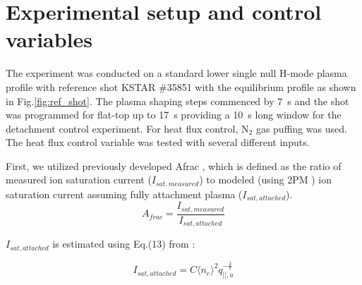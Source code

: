 

\section{Experimental setup and control variables}
\label{sec:control_variables}



The experiment was conducted on a standard lower single null H-mode plasma profile with reference shot KSTAR \#35851 with the equilibrium profile as shown in Fig.\ref{fig:ref_shot}.
The plasma shaping steps commenced by 7~s and the shot was programmed for flat-top up to 17~s providing a 10~s long window for the detachment control experiment.
For heat flux control, N$_2$ gas puffing was used.
The heat flux control variable was tested with several different inputs.

First, we utilized previously developed \ac{Afrac} \cite{Eldon_2022_PPCF}, which is defined as the ratio of measured ion saturation current ($I_{sat, measured}$) to modeled (using 2PM \cite{Leonard_2018_PPCF}) ion saturation current assuming fully attachment plasma ($I_{sat, attached}$).
\begin{equation}
    A_{frac} = \frac{I_{sat, measured}}{I_{sat, attached}}
\end{equation}

$I_{sat, attached}$ is estimated using Eq.(13) from \cite{Eldon_2022_PPCF}:

\begin{equation}
    I_{sat, attached} = C \langle n_{e} \rangle^2 q_{||, a}^{-\frac{3}{7}} 
\end{equation}

